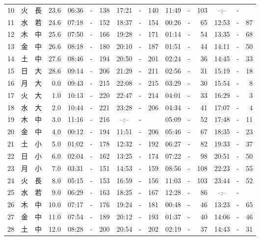 \documentclass[12pt.a4j]{jsarticle}
\begin{document}
\begin{center}
\begin{table}[ht]
\begin{tabular}{|rc|cr|ccrccr|ccrccr|}
10 & 火 & 長 & 23.6 &  06:36 &-& 138  &  17:21 &-& 140  &   11:49 &-& 103  &   --:-- &-&     \\
11 & 水 & 若 & 24.6 &  07:18 &-& 152  &  18:37 &-& 154  &   00:26 &-&  65  &   12:53 &-&  87  \\
12 & 木 & 中 & 25.6 &  07:50 &-& 166  &  19:28 &-& 171  &   01:14 &-&  54  &   13:35 &-&  68  \\
13 & 金 & 中 & 26.6 &  08:18 &-& 180  &  20:10 &-& 187  &   01:51 &-&  44  &   14:11 &-&  50  \\
14 & 土 & 中 & 27.6 &  08:46 &-& 194  &  20:50 &-& 201  &   02:24 &-&  36  &   14:45 &-&  33  \\
15 & 日 & 大 & 28.6 &  09:14 &-& 206  &  21:29 &-& 211  &   02:56 &-&  31  &   15:19 &-&  18  \\
16 & 月 & 大 &  0.0 &  09:43 &-& 215  &  22:08 &-& 215  &   03:29 &-&  30  &   15:54 &-&   8  \\
17 & 火 & 大 &  1.0 &  10:13 &-& 220  &  22:47 &-& 214  &   04:01 &-&  33  &   16:29 &-&   3  \\
18 & 水 & 大 &  2.0 &  10:44 &-& 221  &  23:28 &-& 206  &   04:34 &-&  41  &   17:07 &-&   4  \\
19 & 木 & 中 &  3.0 &  11:16 &-& 216  &  --:-- &-&     &   05:09 &-&  52  &   17:48 &-&  11  \\
20 & 金 & 中 &  4.0 &  00:12 &-& 194  &  11:51 &-& 206  &   05:46 &-&  67  &   18:35 &-&  23  \\
21 & 土 & 小 &  5.0 &  01:02 &-& 178  &  12:32 &-& 192  &   06:27 &-&  82  &   19:33 &-&  37  \\
22 & 日 & 小 &  6.0 &  02:04 &-& 162  &  13:25 &-& 174  &   07:22 &-&  98  &   20:51 &-&  50  \\
23 & 月 & 小 &  7.0 &  03:31 &-& 151  &  14:53 &-& 159  &   08:56 &-& 108  &   22:23 &-&  55  \\
24 & 火 & 長 &  8.0 &  05:15 &-& 153  &  16:59 &-& 156  &   11:03 &-& 103  &   23:44 &-&  52  \\
25 & 水 & 若 &  9.0 &  06:29 &-& 163  &  18:25 &-& 167  &   12:28 &-&  86  &   --:-- &-&     \\
26 & 木 & 中 & 10.0 &  07:17 &-& 176  &  19:24 &-& 181  &   00:48 &-&  46  &   13:23 &-&  65  \\
27 & 金 & 中 & 11.0 &  07:54 &-& 189  &  20:12 &-& 193  &   01:37 &-&  40  &   14:06 &-&  46  \\
28 & 土 & 中 & 12.0 &  08:28 &-& 200  &  20:54 &-& 202  &   02:19 &-&  37  &   14:43 &-&  31  \\

\end{tabular}
\end{table}
\end{center}
\end{document}
